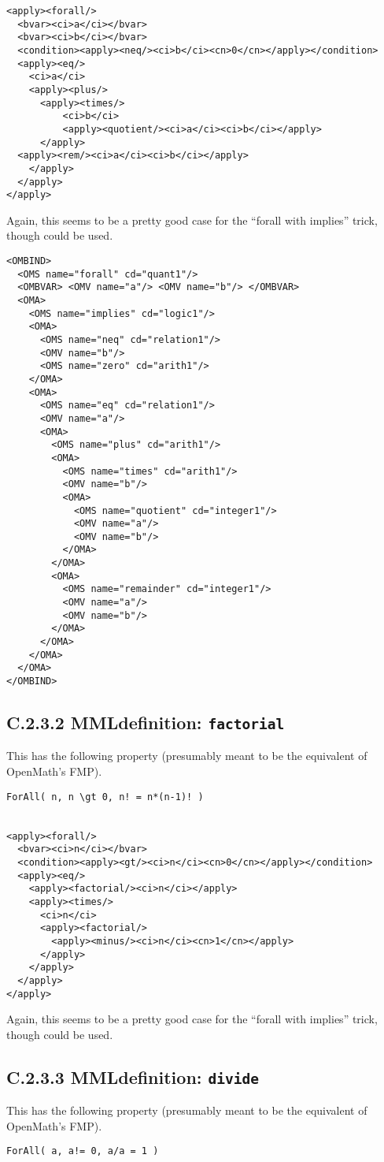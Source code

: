 \documentclass{llncs}
\begin{document}
{\begin{lstlisting}[language=MathML2]
<apply><forall/>
  <bvar><ci>a</ci></bvar>
  <bvar><ci>b</ci></bvar>
  <condition><apply><neq/><ci>b</ci><cn>0</cn></apply></condition>
  <apply><eq/>
    <ci>a</ci>
    <apply><plus/>
      <apply><times/>
          <ci>b</ci>
          <apply><quotient/><ci>a</ci><ci>b</ci></apply>
      </apply>
  <apply><rem/><ci>a</ci><ci>b</ci></apply>
    </apply>
  </apply>
</apply>
\end{lstlisting}
Again, this seems to be a pretty good case for the ``forall with implies''
trick, though {} could be used.
\begin{lstlisting}
<OMBIND>
  <OMS name="forall" cd="quant1"/>
  <OMBVAR> <OMV name="a"/> <OMV name="b"/> </OMBVAR>
  <OMA>
    <OMS name="implies" cd="logic1"/>
    <OMA>
      <OMS name="neq" cd="relation1"/>
      <OMV name="b"/> 
      <OMS name="zero" cd="arith1"/>
    </OMA>
    <OMA>
      <OMS name="eq" cd="relation1"/>
      <OMV name="a"/> 
      <OMA>
        <OMS name="plus" cd="arith1"/>
        <OMA>
          <OMS name="times" cd="arith1"/>
          <OMV name="b"/> 
          <OMA>
            <OMS name="quotient" cd="integer1"/>
            <OMV name="a"/> 
            <OMV name="b"/> 
          </OMA>
        </OMA>
        <OMA>
          <OMS name="remainder" cd="integer1"/>
          <OMV name="a"/> 
          <OMV name="b"/> 
        </OMA>
      </OMA>
    </OMA>
  </OMA>
</OMBIND>
\end{lstlisting}
\subsection{C.2.3.2 MMLdefinition: {\tt factorial}}\label{C232}
This has the following property (presumably meant to be the equivalent of
OpenMath's FMP).
\begin{lstlisting}[language=MathML2]
ForAll( n, n \gt 0, n! = n*(n-1)! )

              
<apply><forall/>
  <bvar><ci>n</ci></bvar>
  <condition><apply><gt/><ci>n</ci><cn>0</cn></apply></condition>
  <apply><eq/>
    <apply><factorial/><ci>n</ci></apply>
    <apply><times/>
      <ci>n</ci>
      <apply><factorial/>
        <apply><minus/><ci>n</ci><cn>1</cn></apply>
      </apply>
    </apply>
  </apply>
</apply>
\end{lstlisting}
Again, this seems to be a pretty good case for the ``forall with implies''
trick, though {} could be used.
\subsection{C.2.3.3 MMLdefinition: {\tt divide}}\label{C233}
This has the following property (presumably meant to be the equivalent of
OpenMath's FMP).
\begin{lstlisting}[language=MathML2]
ForAll( a, a!= 0, a/a = 1 ) 
          

\end{lstlisting}}
\end{document}
